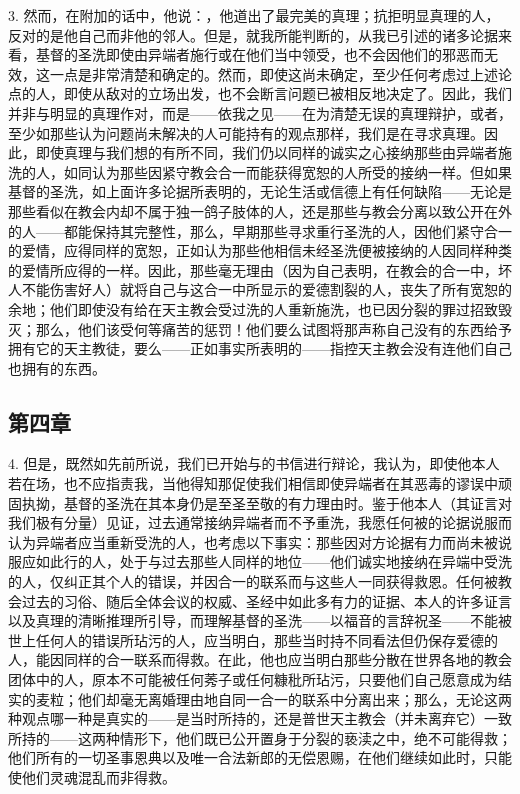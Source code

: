 3. 然而，在附加的话中，他说：，他道出了最完美的真理；抗拒明显真理的人，反对的是他自己而非他的邻人。但是，就我所能判断的，从我已引述的诸多论据来看，基督的圣洗即使由异端者施行或在他们当中领受，也不会因他们的邪恶而无效，这一点是非常清楚和确定的。然而，即使这尚未确定，至少任何考虑过上述论点的人，即使从敌对的立场出发，也不会断言问题已被相反地决定了。因此，我们并非与明显的真理作对，而是——依我之见——在为清楚无误的真理辩护，或者，至少如那些认为问题尚未解决的人可能持有的观点那样，我们是在寻求真理。因此，即使真理与我们想的有所不同，我们仍以同样的诚实之心接纳那些由异端者施洗的人，如同认为那些因紧守教会合一而能获得宽恕的人所受的接纳一样。但如果基督的圣洗，如上面许多论据所表明的，无论生活或信德上有任何缺陷——无论是那些看似在教会内却不属于独一鸽子肢体的人，还是那些与教会分离以致公开在外的人——都能保持其完整性，那么，早期那些寻求重行圣洗的人，因他们紧守合一的爱情，应得同样的宽恕，正如认为那些他相信未经圣洗便被接纳的人因同样种类的爱情所应得的一样。因此，那些毫无理由（因为自己表明，在教会的合一中，坏人不能伤害好人）就将自己与这合一中所显示的爱德割裂的人，丧失了所有宽恕的余地；他们即使没有给在天主教会受过洗的人重新施洗，也已因分裂的罪过招致毁灭；那么，他们该受何等痛苦的惩罚！他们要么试图将那声称自己没有的东西给予拥有它的天主教徒，要么——正如事实所表明的——指控天主教会没有连他们自己也拥有的东西。\par


\subsection{第四章}

4. 但是，既然如先前所说，我们已开始与的书信进行辩论，我认为，即使他本人若在场，也不应指责我，当他得知那促使我们相信即使异端者在其恶毒的谬误中顽固执拗，基督的圣洗在其本身仍是至圣至敬的有力理由时。鉴于他本人（其证言对我们极有分量）见证，过去通常接纳异端者而不予重洗，我愿任何被的论据说服而认为异端者应当重新受洗的人，也考虑以下事实：那些因对方论据有力而尚未被说服应如此行的人，处于与过去那些人同样的地位——他们诚实地接纳在异端中受洗的人，仅纠正其个人的错误，并因合一的联系而与这些人一同获得救恩。任何被教会过去的习俗、随后全体会议的权威、圣经中如此多有力的证据、本人的许多证言以及真理的清晰推理所引导，而理解基督的圣洗——以福音的言辞祝圣——不能被世上任何人的错误所玷污的人，应当明白，那些当时持不同看法但仍保存爱德的人，能因同样的合一联系而得救。在此，他也应当明白那些分散在世界各地的教会团体中的人，原本不可能被任何莠子或任何糠秕所玷污，只要他们自己愿意成为结实的麦粒；他们却毫无离婚理由地自同一合一的联系中分离出来；那么，无论这两种观点哪一种是真实的——是当时所持的，还是普世天主教会（并未离弃它）一致所持的——这两种情形下，他们既已公开置身于分裂的亵渎之中，绝不可能得救；他们所有的一切圣事恩典以及唯一合法新郎的无偿恩赐，在他们继续如此时，只能使他们灵魂混乱而非得救。\par

